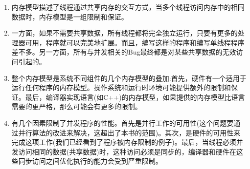\begin{enumerate}
\item 
内存模型描述了线程通过共享内存的交互方式，当多个线程访问内存中的相同数据时，内存模型是一组限制和保证。

\item 
一方面，如果不需要共享数据，所有线程都将完全独立运行，只要有更多的处理器可用，程序就可以完美地扩展。而且，编写这样的程序和编写单线程程序差不多。另一方面，所有与并发相关的Bug最终都是对某些共享数据的无效访问引起的。

\item 
整个内存模型是系统不同组件的几个内存模型的叠加:首先，硬件有一个适用于运行任何程序的内存模型。操作系统和运行时环境可能提供额外的限制和保证。最后，编译器实现语言(如C++)的内存模型，如果提供的内存模型比语言需要的更严格，那么可能会有更多的限制。

\item
有几个因素限制了并发程序的性能。首先是并行工作的可用性(这个问题要通过并行算法的改进来解决，这超出了本书的范围)。其次，是硬件的可用性来完成这项工作(我们已经看到了程序被内存限制的例子)。最后，当线程必须并发访问相同的数据(共享数据)时，这种访问必须是同步的，编译器和硬件在这些同步访问之间优化执行的能力会受到严重限制。

\end{enumerate}